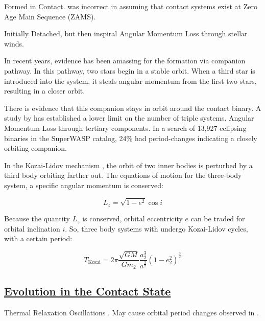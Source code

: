 \documentclass[12pt]{article} %
\numberwithin{equation}{section} %
\begin{document}
Formed in Contact. \citet{lucy1968structure} was incorrect in assuming that contact systems exist at Zero Age Main Sequence (ZAMS).

\citep{yildiz2013origin}

\citep{bilir2005kinematics}

\citep{li2007formation}

Initially Detached, but then inspiral
Angular Momentum Loss through stellar winds. 


In recent years, evidence has been amassing for the formation via companion pathway. In this pathway, two stars begin in a stable orbit. When a third star is introduced into the system, it steals angular momentum from the first two stars, resulting in a closer orbit. 

There is evidence that this companion stays in orbit around the contact binary.
A study by \citet{pribulla2006contact} has established a lower limit on the number of triple systems. Angular Momentum Loss through tertiary components.  \citep{lohr2015orbital} In a search of 13,927 eclipsing binaries in the SuperWASP catalog, 24\% had period-changes indicating a closely orbiting companion.

In the Kozai-Lidov mechanism , the orbit of two inner bodies is perturbed by a third body orbiting farther out. The equations of motion for the three-body system, a specific angular momentum is conserved:

\begin{equation} \label{kozai_1}
L_{z} = \sqrt{1- e^{2}} \cos i
\end{equation}

Because the quantity $L_{z}$ is conserved, orbital eccentricity $e$ can be traded for orbital inclination $i$. So, three body systems with undergo Kozai-Lidov cycles, with a certain period:

\begin{equation} \label{kozai_2}
T_{\text{Kozai}} = 2 \pi \frac{\sqrt{GM}}{G m_{2}} \frac{a_{2}^{3}}{a^{\frac{3}{2}}} (1 - e^{2}_{2})^{\frac{3}{2}}
\end{equation}


\subsection[Evolution in the Contact State]{\hyperlink{toc}{Evolution in the Contact State}}

Thermal Relaxation Oscillations \citep{wang1994thermal}. May cause orbital period changes observed in \citet{qian2001orbital}.
\end{document}
